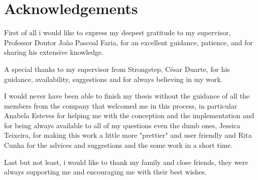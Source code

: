 \chapter*{Acknowledgements}

First of all i would like to express my deepest gratitude to my supervisor, Professor Doutor João Pascoal Faria, for an excellent guidance, patience, and for sharing his extensive knowledge.

A special thanks to my supervisor from Strongstep, César Duarte, for his guidance, availability, suggestions and for always believing in my work. 

I would never have been able to finish my thesis without the guidance of all the members from the company that welcomed me in this process, in particular Anabela Esteves for helping me with the conception and the implementation and for being always available to all of my questions even the dumb ones, Jessica Teixeira, for making this work a little more "prettier" and user friendly and Rita Cunha for the advices and suggestions and the some work in a short time.

Last but not least, i would like to thank my family and close friends, they were always supporting me and encouraging me with their best wishes.
\vspace{10mm}
